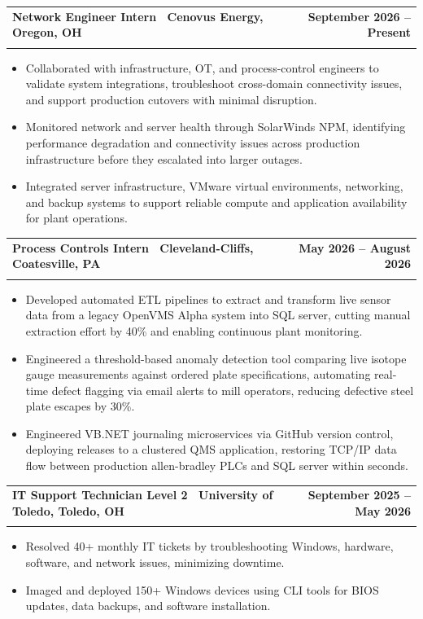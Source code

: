\documentclass[letterpaper,11pt]{article}
\makeatletter
\newcommand{\resumeItem}[1]{\item\small{#1 \vspace{-4pt}}}  %
\newcommand{\resumeSubheading}[4]{
    \vspace{-2pt}\item
    \begin{tabular*}{1.0\textwidth}[t]{l@{\extracolsep{\fill}}r}
        \textbf{#1} & \textbf{\small #2} \\
        \textit{\small#3} & \textit{\small #4}
    \end{tabular*}\vspace{-7pt}
}
\newcommand{\resumeItemListStart}{\begin{itemize}}
\newcommand{\resumeItemListEnd}{\end{itemize}\vspace{-7pt}}  %
\makeatother
\begin{document}
\resumeSubheading
{\textbf{Network Engineer Intern} \textnormal{\textbar\ Cenovus Energy, Oregon, OH}}{September 2026 -- Present}
{}{}
\vspace{-0.6cm}
\resumeItemListStart
\resumeItem{Collaborated with infrastructure, OT, and process-control engineers to validate system integrations, troubleshoot cross-domain connectivity issues, and support production cutovers with minimal disruption.}
\vspace{0.15cm}
\resumeItem{Monitored network and server health through SolarWinds NPM, identifying performance degradation and connectivity issues across production infrastructure before they escalated into larger outages.}
\vspace{0.15cm}
\resumeItem{Integrated server infrastructure, VMware virtual environments, networking, and backup systems to support reliable compute and application availability for plant operations.}
\vspace{0.15cm}
\resumeItemListEnd

\resumeSubheading
{\textbf{Process Controls Intern} \textnormal{\textbar\ Cleveland-Cliffs, Coatesville, PA}}{May 2026 -- August 2026}
{}{}
\vspace{-0.6cm}
\resumeItemListStart
\resumeItem{Developed automated ETL pipelines to extract and transform live sensor data from a legacy OpenVMS Alpha system into SQL server, cutting manual extraction effort by 40\% and enabling continuous plant monitoring.}
\vspace{0.15cm}
\resumeItem{Engineered a threshold-based anomaly detection tool comparing live isotope gauge measurements against ordered plate specifications, automating real-time defect flagging via email alerts to mill operators, reducing defective steel plate escapes by 30\%.}
\vspace{0.15cm}
\resumeItem{Engineered VB.NET journaling microservices via GitHub version control, deploying releases to a clustered QMS application, restoring TCP/IP data flow between production allen-bradley PLCs and SQL server within seconds.}
\vspace{0.15cm}
\resumeItemListEnd

\resumeSubheading
{\textbf{IT Support Technician Level 2} \textnormal{\textbar\ University of Toledo, Toledo, OH}}{September 2025 -- May 2026}
{}{}
\vspace{-0.6cm}
\resumeItemListStart
\resumeItem{Resolved 40+ monthly IT tickets by troubleshooting Windows, hardware, software, and network issues, minimizing downtime.}
\vspace{0.15cm}
\resumeItem{Imaged and deployed 150+ Windows devices using CLI tools for BIOS updates, data backups, and software installation.}
\vspace{0.15cm}
\resumeItemListEnd
\end{document}
